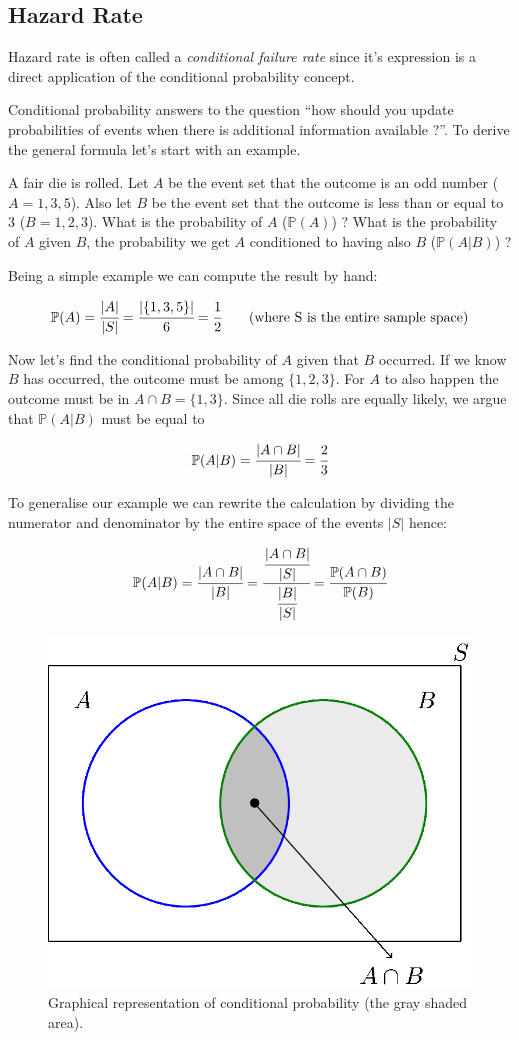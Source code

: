 \subsection{Hazard Rate}\label{hazard-rate}

Hazard rate is often called a \emph{conditional failure rate} since it's
expression is a direct application of the conditional probability
concept.

Conditional probability answers to the question ``how should you update
probabilities of events when there is additional information available
?''. To derive the general formula let's start with an example.

A fair die is rolled. Let \(A\) be the event set that the outcome is an odd
number (\(A={1,3,5}\)). Also let \(B\) be the event set that the outcome is
less than or equal to \(3\) (\(B={1,2,3}\)). What is the probability of
\(A\) (\(\mathbb{P}(A)\)) ? What is the probability of \(A\) given \(B\), the probability we get $A$ conditioned to having also $B$
(\(\mathbb{P}(A|B)\)) ?

Being a simple example we can compute the result by hand:

\[\mathbb{P}(A) = \cfrac{|A|}{|S|} = \cfrac{|\{1,3,5\}|}{6} = \cfrac{1}{2}\qquad\textrm{(where S is the entire sample space)}\]

Now let's find the conditional probability of \(A\) given that \(B\)
occurred. If we know \(B\) has occurred, the outcome must be among
\(\{1,2,3\}\). For \(A\) to also happen the outcome must be in
\(A\cap B = \{1,3\}\). Since all die rolls are equally likely, we argue
that \(\mathbb{P}(A|B)\) must be equal to

\[\mathbb{P}(A|B) = \cfrac{|A\cap B|}{|B|} = \cfrac{2}{3}\]

To generalise our example we can rewrite the calculation by dividing the
numerator and denominator by the entire space of the events \(|S|\)
hence:

\[\mathbb{P}(A|B) = \cfrac{|A\cap B|}{|B|} = \cfrac{\cfrac{|A\cap B|}{|S|}}{\cfrac{|B|}{|S|}} = \cfrac{\mathbb{P}(A\cap B)}{\mathbb{P}(B)}\]

\begin{figure}[tb]
\centering
\includegraphics[width=0.7\linewidth]{figures/conditional_b.png}
\caption{Graphical representation of conditional probability (the gray shaded area).}
\end{figure}

